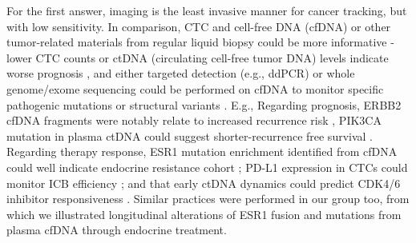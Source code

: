 For the first answer, imaging is the least invasive manner for cancer tracking, but with low sensitivity. In comparison, CTC and cell-free DNA (cfDNA) or other tumor-related materials from regular liquid biopsy could be more informative - lower CTC counts or ctDNA (circulating cell-free tumor DNA) levels indicate worse prognosis \citep{bidard2014clinical}, and either targeted detection (e.g., ddPCR) or whole genome/exome sequencing could be performed on cfDNA to monitor specific pathogenic mutations or structural variants \citep{alimirzaie2019liquid}. E.g., Regarding prognosis, ERBB2 cfDNA fragments were notably relate to increased recurrence risk \citep{maltoni2017cell}, PIK3CA mutation in plasma ctDNA could suggest shorter-recurrence free survival \citep{oshiro2015pik3ca}. Regarding therapy response, ESR1 mutation enrichment identified from cfDNA could well indicate endocrine resistance cohort \citep{beije2018estrogen}; PD-L1 expression in CTCs could monitor ICB efficiency \citep{mazel2015frequent}; and that early ctDNA dynamics could predict CDK4/6 inhibitor responsiveness \citep{o2018early}. Similar practices were performed in our group too, from which we illustrated longitudinal alterations of ESR1 fusion and mutations from plasma cfDNA through endocrine treatment.

